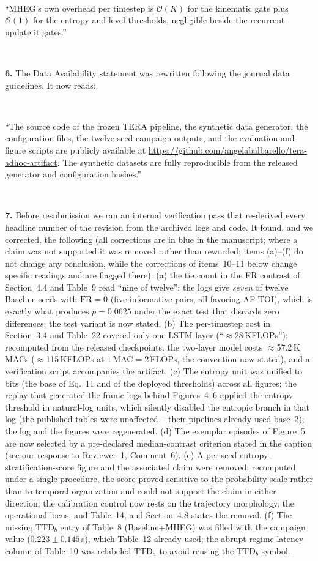 \documentclass[1p,12pt,authoryear]{elsarticle}
\begin{document}
~

``MHEG's own overhead per timestep is $\mathcal{O}(K)$ for the kinematic gate plus $\mathcal{O}(1)$ for the entropy and level thresholds, negligible beside the recurrent update it gates.''

~

\noindent \textbf{6.} The Data Availability statement was rewritten following the journal data guidelines. It now reads:

~

``The source code of the frozen TERA pipeline, the synthetic data generator, the configuration files, the twelve-seed campaign outputs, and the evaluation and figure scripts are publicly available at \url{https://github.com/angelabalbarello/tera-adhoc-artifact}. The synthetic datasets are fully reproducible from the released generator and configuration hashes.''

~

\noindent \textbf{7.} Before resubmission we ran an internal verification pass that re-derived every headline number of the revision from the archived logs and code. It found, and we corrected, the following (all corrections are in blue in the manuscript; where a claim was not supported it was removed rather than reworded; items (a)--(f) do not change any conclusion, while the corrections of items~10--11 below change specific readings and are flagged there): (a) the tie count in the FR contrast of Section~4.4 and Table~9 read ``nine of twelve''; the logs give \emph{seven} of twelve Baseline seeds with $\mathrm{FR}=0$ (five informative pairs, all favoring AF-TOI), which is exactly what produces $p=0.0625$ under the exact test that discards zero differences; the test variant is now stated. (b) The per-timestep cost in Section~3.4 and Table~22 covered only one LSTM layer (``$\approx$28\,KFLOPs''); recomputed from the released checkpoints, the two-layer model costs $\approx$57.2\,K MACs ($\approx$115\,KFLOPs at 1\,MAC${}={}$2\,FLOPs, the convention now stated), and a verification script accompanies the artifact. (c) The entropy unit was unified to bits (the base of Eq.~11 and of the deployed thresholds) across all figures; the replay that generated the frame logs behind Figures~4--6 applied the entropy threshold in natural-log units, which silently disabled the entropic branch in that log (the published tables were unaffected -- their pipelines already used base~2); the log and the figures were regenerated. (d) The exemplar episodes of Figure~5 are now selected by a pre-declared median-contrast criterion stated in the caption (see our response to Reviewer~1, Comment~6). (e) A per-seed entropy-stratification-score figure and the associated claim were removed: recomputed under a single procedure, the score proved sensitive to the probability scale rather than to temporal organization and could not support the claim in either direction; the calibration control now rests on the trajectory morphology, the operational locus, and Table~14, and Section~4.8 states the removal. (f) The missing $\mathrm{TTD}_b$ entry of Table~8 (Baseline+MHEG) was filled with the campaign value ($0.223 \pm 0.145$\,s), which Table~12 already used; the abrupt-regime latency column of Table~10 was relabeled $\mathrm{TTD}_a$ to avoid reusing the $\mathrm{TTD}_b$ symbol.
\end{document}
